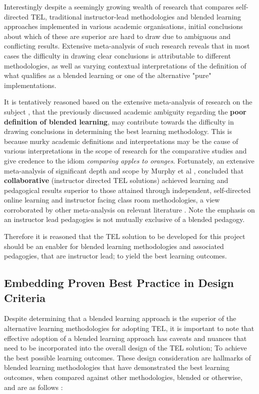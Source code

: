 Interestingly despite a seemingly growing wealth of research that compares self-directed TEL, traditional instructor-lead methodologies and blended learning approaches implemented in various academic organisations, initial conclusions about which of these are superior are hard to draw due to ambiguous and conflicting results. Extensive meta-analysis of such research \cite{RickReis,Means2009,Team2008} reveals that in most cases the  difficulty in drawing clear conclusions is attributable to different methodologies, as well as varying contextual interpretations of the definition of what qualifies as a blended learning or one of the alternative "pure" implementations.
\newpage

It is tentatively reasoned based on the extensive meta-analysis of research on the subject \cite{Means2009,Team2008,RickReis}, that the previously discussed academic ambiguity regarding the \textbf{poor definition of blended learning}, may contribute towards the difficulty in drawing conclusions in determining the best learning methodology. This is because murky academic definitions and interpretations may be the cause of various interpretations in the scope of research for the comparative studies \cite{Means2009,RickReis,Team2008} and give credence to the idiom \textit{comparing apples to oranges}. Fortunately, an extensive meta-analysis of significant depth and scope by Murphy et al \cite{Means2009},   concluded that \textbf{collaborative} (instructor directed TEL solutions)  achieved learning and pedagogical results superior to those attained through independent, self-directed online learning \cite{RickReis} and instructor facing class room methodologies, a view corroborated by other  meta-analysis on relevant literature  \cite{Means2009,Team2008,RickReis}. Note the emphasis on an instructor lead pedagogies is not mutually exclusive of a blended pedagogy.

Therefore it is reasoned that the TEL solution to be developed for this project should be an enabler for blended learning methodologies and associated pedagogies, that are instructor lead; to yield the best learning outcomes.

\label{sec:sec01}
\subsection{Embedding Proven Best Practice in Design Criteria}
\label{subsec:subsec01}

Despite determining that a blended learning approach is the superior of the alternative learning methodologies for adopting TEL, it is important to note that effective adoption of a blended learning approach has caveats and nuances that need to be incorporated into the overall design of the TEL solution; To achieve the best possible learning outcomes. These design consideration are hallmarks of blended learning methodologies that have demonstrated the best learning outcomes, when compared against other methodologies, blended or otherwise, and are as follows \cite{Means2009,Team2008,RickReis}:


